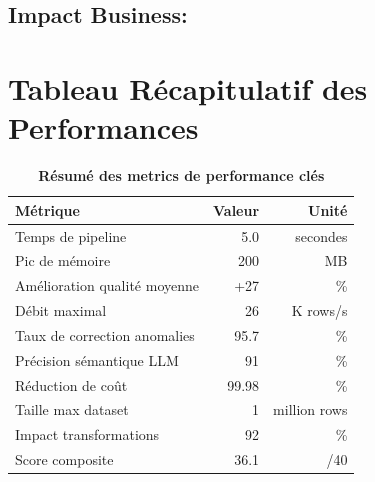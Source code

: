 \subsection*{Impact Business:}


\section{Tableau Récapitulatif des Performances}

\begin{table}[h!]
    \centering
    \caption{\textbf{Résumé des metrics de performance clés}}
    \begin{tabular}{lrr}
        \toprule
        \textbf{Métrique} & \textbf{Valeur} & \textbf{Unité} \\
        \midrule
        Temps de pipeline & 5.0 & secondes \\
        Pic de mémoire & 200 & MB \\
        Amélioration qualité moyenne & +27 & \% \\
        Débit maximal & 26 & K rows/s \\
        Taux de correction anomalies & 95.7 & \% \\
        Précision sémantique LLM & 91 & \% \\
        Réduction de coût & 99.98 & \% \\
        Taille max dataset & 1 & million rows \\
        Impact transformations & 92 & \% \\
        Score composite & 36.1 & /40 \\
        \bottomrule
    \end{tabular}
    \label{tab:performance_summary}
\end{table}

